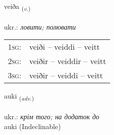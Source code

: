 \documentclass[frontgrid, backgrid]{flacards}\usepackage[]{graphicx}\usepackage[]{xcolor}
\begin{document}
\renewcommand{\flhead}{\vskip5pt \fboxsep=0pt {\small\bfseries\footnotesize Sagnorð | дієслово}}
\renewcommand{\fcfoot}{\vskip5pt \fboxsep=0pt \hspace{2pt}{\small\bfseries\footnotesize 2K}}

\renewcommand{\blhead}{\vskip5pt {\small\bfseries\footnotesize Sagnorð | дієслово }}
\renewcommand{\bcfoot}{\vskip5pt \hspace{2pt}{\small\bfseries\footnotesize 2K}}


{veiða \small{\textsubscript{(\textit{v.})}} \\[1ex] %
\textphonetic{[veiːða]} \\
ukr.: \emph{ловити; полювати} \\  [2ex]
\renewcommand*{\arraystretch}{0.8}
\begin{tabular}{p{1cm}l}
\textsc{1sg}: & veiði -- veiddi -- veitt \\ 
\textsc{2sg}: & veiðir -- veiddir -- veitt \\ 
\textsc{3sg}: & veiðir -- veiddi -- veitt \\ 
\end{tabular}
}


\renewcommand{\flhead}{\vskip5pt \fboxsep=0pt {\small\bfseries\footnotesize Atviksorð | прислівник}}
\renewcommand{\fcfoot}{\vskip5pt \fboxsep=0pt \hspace{2pt}{\small\bfseries\footnotesize 2K}}

\renewcommand{\blhead}{\vskip5pt {\small\bfseries\footnotesize Atviksorð | прислівник }}
\renewcommand{\bcfoot}{\vskip5pt \hspace{2pt}{\small\bfseries\footnotesize 2K}}


{auki \small{\textsubscript{(\textit{adv.})}} \\[1ex]
\textphonetic{[œiːcɪ]} \\
ukr.: \emph{крім того; на додаток до} \\  [2ex]
auki (Indeclinable)}
\end{document}
